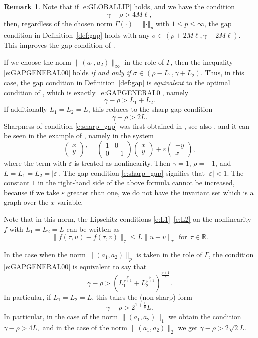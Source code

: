 \documentclass[a4paper,11pt,reqno]{amsart}
\theoremstyle{plain}
\theoremstyle{definition}
\newtheorem{rem}[lem]{Remark}
\numberwithin{equation}{section}
\newcommand{\R}{\mathbb{R}}
\newcommand{\norm}[1]{\left\Vert#1\right\Vert}
\renewcommand{\leq}{\leqslant}
\begin{document}
\begin{rem}\label{rem:SHARPNESS}
Note that if \eqref{e:GLOBALLIP} holds, and we have the condition 
\begin{equation*}%
	\gamma-\rho>4M\ell,
\end{equation*}
then, regardless of the chosen norm $\Gamma(\cdot)=\norm{\cdot}_p$ with $1\leq p\leq \infty$, the gap condition in Definition~\ref{def:gap} holds with any $\sigma\in(\rho+2M\ell,\gamma-2M\ell)$. This improves the gap condition of \cite{CLMO-S25}. 

If we choose the norm $\|(a_1,a_2)\|_\infty$ in the role of $\Gamma$, then the inequality \eqref{e:GAPGENERAL00} holds
\emph{if and only if} $\sigma\in(\rho-L_1,\gamma+L_2)$. Thus, in this case, the gap condition in Definition~\ref{def:gap} is \emph{equivalent} to the optimal condition of \cite{LL99}, which is exactly~\eqref{e:GAPGENERAL0}, namely
$$\gamma-\rho>L_1+L_2.$$ 
If additionally $L_1 = L_2 =L$, this reduces to the sharp gap condition 
\begin{equation}\label{e:sharp_gap}
\gamma-\rho>2L.
\end{equation}
Sharpness of condition \eqref{e:sharp_gap} was first obtained in \cite{Miklavcic, Romanov}, see also \cite{CR96,LL99,Zelik}, and it can be seen in the example of \cite{CR96}, namely in the system
$$
\begin{pmatrix}
	x \\ y 
\end{pmatrix}' = \begin{pmatrix}
1 & 0 \\ 0 & -1 
\end{pmatrix} 
\begin{pmatrix}
	x \\ y 
\end{pmatrix} + \varepsilon\begin{pmatrix}
- y \\  x 
\end{pmatrix},
$$
where the term with $\varepsilon$ is treated as nonlinearity. Then $\gamma=1$, $\rho=-1$, and $L=L_1=L_2=|\varepsilon|$. The gap condition \eqref{e:sharp_gap} signifies that $|\varepsilon| < 1$. The constant $1$ in the right-hand side of the above formula cannot be increased, because if we take $\varepsilon$ greater than one, we do not have the invariant set which is a graph over the $x$ variable. 

Note that in this norm, the Lipschitz conditions \eqref{e:L1}--\eqref{e:L2} on the nonlinearity $f$ with $L_1=L_2=L$ can be written as 
$$\|f(\tau,u)-f(\tau,v)\|_\tau \leq L\|u-v\|_\tau\ \ \text{for}\ \ \tau\in \R.$$


In the case when the norm $\|(a_1,a_2)\|_p$ is taken in the role of $\Gamma$, the condition \eqref{e:GAPGENERAL00} is equivalent to say that
$$
\gamma-\rho > \left(L_1^{\frac{p}{p+1}}+L_2^{\frac{p}{p+1}}\right)^\frac{p+1}{p}.
$$
In particular, if $L_1=L_2=L$, this takes the (non-sharp) form
$$\gamma-\rho > 2^{1+\frac{1}{p}}L.$$
In particular, in the case of the norm $\|(a_1,a_2)\|_1$ we obtain the condition 
$\gamma-\rho>4L,$ and in the case of the norm $\|(a_1,a_2)\|_2$ we get $\gamma-\rho>2\sqrt{2}L.$ 
\end{rem}
\end{document}
